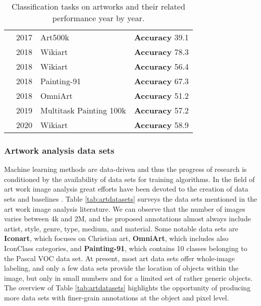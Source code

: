 \documentclass[acmlarge]{acmart}
\begin{document}
\begin{table}[tp]
\begin{tabular}{|p{3.2cm}|c|p{3.8cm}|p{3.9cm}|}
& 2017  & Art500k & \textbf{Accuracy} 39.1 \cite{mao2017deepart} \\ \cline{2-4}
& 2018 & Wikiart & \textbf{Accuracy} 78.3 \cite{chu2018image} \\ \cline{2-4}
& 2018 & Wikiart & \textbf{Accuracy} 56.4 \cite{cetinic2018fine} \\ \cline{2-4}
& 2018 & Painting-91 & \textbf{Accuracy} 67.3 \cite{falomir2018categorizing} \\ \cline{2-4}
& 2018 & OmniArt & \textbf{Accuracy} 51.2 \cite{strezoski2018omniart} \\ \cline{2-4}
& 2019 & Multitask Painting 100k& \textbf{Accuracy} 57.2 \cite{Bianco2019MultitaskPC} \\ \cline{2-4}
& 2020 & Wikiart & \textbf{Accuracy} 58.9 \cite{zhong2020fine} \\ \hline
\end{tabular}
\caption{Classification tasks on artworks and their related performance year by year.}
\label{tab:arttaskperf}
\end{table}









\subsubsection{Artwork analysis data sets}
Machine learning methods are data-driven and thus the progress of research is conditioned by the availability of data sets for training algorithms. In the field of  art work 
image analysis great efforts have been devoted to the creation of data sets and baselines   \cite{wilber2017bam,mao2017deepart,strezoski2017omniart,gonthier2018weakly,bianco2019multitask,stefanini2019artpedia,strezoski2020omnieyes}. 
Table \ref{tab:artdatasets} surveys the data sets mentioned in the art work image analysis  literature. We can observe that the number of images varies between  4k and  2M, and the proposed annotations almost always include artist, style, genre, type, medium, and material. Some notable data sets are \textbf{Iconart}, which focuses on Christian art, \textbf{OmniArt}, which includes also IconClass categories, and \textbf{Painting-91}, which contains 10 classes belonging to the Pascal VOC data set. At present,  most art data sets offer whole-image labeling, and  only a few data sets provide the location of  objects within the image,  but only in small numbers and for a limited set of rather generic objects. The overview of Table \ref{tab:artdatasets} highlights the opportunity of producing more data sets with finer-grain annotations at the object and pixel level.
\end{document}
